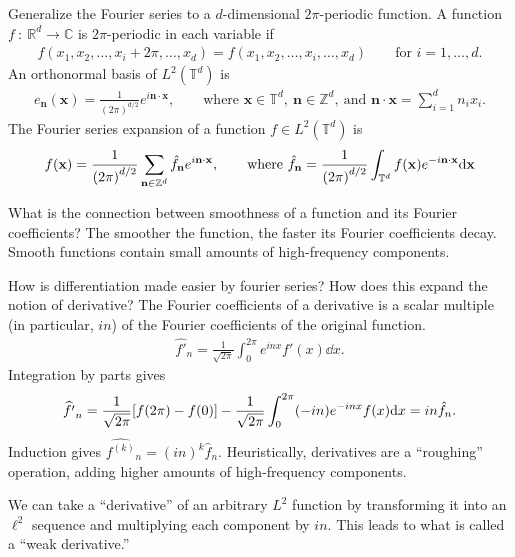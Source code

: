 \documentclass[avery5388,grid,frame]{flashcards}
\def\Rl{\mathbb{R}}
\def\Cx{\mathbb{C}}
\def\torus{\mathbb{T}}
\begin{document}
\begin{flashcard}
    {Generalize the Fourier series to a $d$-dimensional $2\pi$-periodic function.}
    A function $f\ :\ \Rl^d \rightarrow \Cx$ is $2\pi$-periodic in each variable if
    \begin{align*}
        f(x_1, x_2, \dots, x_i + 2\pi, \dots, x_d) = f(x_1, x_2, \dots, x_i, \dots, x_d) \qquad \text{for } i = 1, \dots, d.
    \end{align*}
    An orthonormal basis of $L^2(\torus^d)$ is
    \begin{align*}
        e_\textbf{n}(\textbf{x}) = \frac{1}{(2\pi)^{d/2}}e^{i \textbf{n}\cdot \textbf{x}}, \qquad \text{where } \textbf{x} \in \torus^d,\ \textbf{n} \in \mathbb{Z}^d,\ \text{and } \textbf{n}\cdot\textbf{x} = \sum_{i=1}^d n_ix_i.
    \end{align*}
    The Fourier series expansion of a function $f \in L^2(\torus^d)$ is
    \begin{align*}
        f(\textbf{x}) = \frac{1}{\qty(2\pi)^{d/2}}\sum_{\textbf{n}\in \mathbb{Z}^d}\hat{f}_\textbf{n}e^{i \textbf{n}\cdot \textbf{x}}, \qquad \text{where } \hat{f}_\textbf{n} = \frac{1}{\qty(2\pi)^{d/2}}\int_{\torus^d}f(\textbf{x})e^{-i \textbf{n}\cdot \textbf{x}}\dd \textbf{x}
    \end{align*}
\end{flashcard}

\begin{flashcard}
    {What is the connection between smoothness of a function and its Fourier coefficients?}
    The smoother the function, the faster its Fourier coefficients decay.  Smooth functions contain small amounts of high-frequency components.
\end{flashcard}

\begin{flashcard}
    {How is differentiation made easier by fourier series?  How does this expand the notion of derivative?}
    The Fourier coefficients of a derivative is a scalar multiple (in particular, $in$) of the Fourier coefficients of the original function.
    \begin{align*}
        \widehat{f'}_n = \frac{1}{\sqrt{2\pi}}\int_0^{2\pi} e^{inx}f'(x)\dd x.
    \end{align*}
    Integration by parts gives
    \begin{align*}
        \widehat{f'}_n = \frac{1}{\sqrt{2\pi}}\qty[f(2\pi) - f(0)] - \frac{1}{\sqrt{2\pi}}\int_0^{2\pi}(-in)e^{-inx}f(x) \dd x = in\hat{f}_n.
    \end{align*}
    Induction gives $\widehat{f^{(k)}}_n = (in)^k\hat{f}_n$.  Heuristically, derivatives are a ``roughing'' operation, adding higher amounts of high-frequency components.

    We can take a ``derivative'' of an arbitrary $L^2$ function by transforming it into an $\ell^2$ sequence and multiplying each component by $in$.  This leads to what is called a ``weak derivative.''
\end{flashcard}
\end{document}
